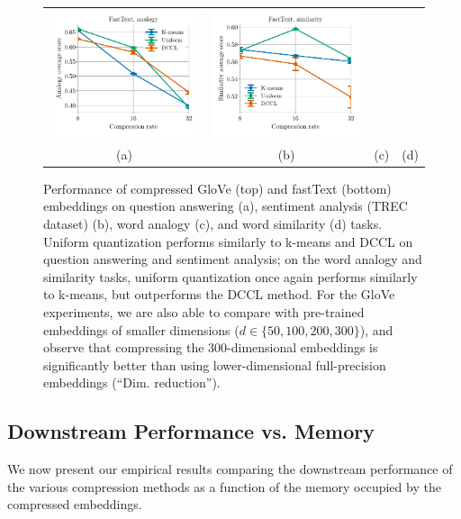 \begin{figure}
\begin{tabular}{@{\hskip -0.0in}c@{\hskip -0.0in}c@{\hskip -0.0in}c@{\hskip -0.0in}c@{\hskip -0.0in}}
		\includegraphics[width=.245\linewidth]{figures/fasttext1m_intrinsics_analogy-avg-score_vs_compression_linx.pdf} &
		\includegraphics[width=.245\linewidth]{figures/fasttext1m_intrinsics_similarity-avg-score_vs_compression_linx.pdf} \\
		\;\;\;\;\;(a) & \;\;\;\;\;\;(b) & \;\;\;\;\;\;(c) & \;\;\;\;\;\;(d)
	\end{tabular}
	\caption{Performance of compressed GloVe (top) and fastText (bottom) embeddings on question answering (a), sentiment analysis (TREC dataset) (b), word analogy (c), and word similarity (d) tasks.
		Uniform quantization performs similarly to k-means and DCCL on question answering and sentiment analysis;
		on the word analogy and similarity tasks, uniform quantization once again performs similarly to k-means, but outperforms the DCCL method.
		For the GloVe experiments, we are also able to compare with pre-trained embeddings of smaller dimensions ($d\in\{50,100,200,300\}$), and observe that compressing the 300-dimensional embeddings is significantly better than using lower-dimensional full-precision embeddings (``Dim. reduction'').
	}
	\label{fig:perf_comp}
\end{figure}


\subsection{Downstream Performance vs. Memory}
\label{sec:perf_comp}

We now present our empirical results comparing the downstream performance of the various compression methods as a function of the memory occupied by the compressed embeddings.

